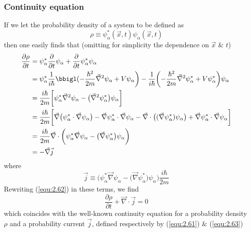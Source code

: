 \subsubsection{Continuity equation}
If we let the probability density of a system to be defined
as
\begin{equation}
  \rho \equiv \psi^*_{\alpha}(\vec{x},t)
  \psi_{\alpha}(\vec{x},t)
  \label{equ:2.61}
\end{equation}
then one easily finds that (omitting for simplicity the
dependence on $\vec{x}$ \& $t$)
\begin{align}
  \frac{\partial \rho}{\partial t} &= \psi_{\alpha}^*
  \frac{\partial}{\partial t} \psi_{\alpha} +
  \frac{\partial}{\partial t} \psi_{\alpha}^* \psi_{\alpha}
  \nonumber \\
  &=
  \psi_{\alpha}^* \frac{1}{i\hbar}
  \bbigl(-\frac{\hbar^2}{2m}\vec{\nabla}^2 \psi_{\alpha} +
  V\psi_{\alpha}\biggr) - 
  \frac{1}{i\hbar} \biggl(-\frac{\hbar^2}{2m}\vec{\nabla}^2
  \psi_{\alpha}^* + V\psi_{\alpha}^* \biggr) \psi_{\alpha}
  \nonumber \\
  &=
  \frac{i\hbar}{2m} \biggl[\psi_{\alpha}^* \vec{\nabla}^2
  \psi_{\alpha}-\bigl(\vec{\nabla}^2
\psi_{\alpha}^*\bigr)\psi_{\alpha}\biggr] \nonumber \\
&=
\frac{i\hbar}{2m}
\biggl[
  \vec{\nabla}\bigl(\psi_{\alpha}^*\cdot
  \vec{\nabla}\psi_{\alpha}\bigr)-
  \vec{\nabla}\psi_{\alpha}^* \cdot
  \vec{\nabla}\psi_{\alpha} -
  \vec{\nabla}\cdot\bigl((\vec{\nabla}\psi_{\alpha}^*)\psi_{\alpha}\bigr)
  +
  \vec{\nabla}\psi_{\alpha}^* \cdot \vec{\nabla}\psi_{\alpha}
\biggr]\nonumber \\
&=
\frac{i\hbar}{2m} \vec{\nabla}\cdot \biggl(\psi_{\alpha}^* 
\vec{\nabla}\psi_{\alpha} -
\bigl(\vec{\nabla}\psi_{\alpha}^*\bigr)\psi_{\alpha}
\biggr) \nonumber\\
&=
- \vec{\nabla} \vec{j} \label{equ:2.62}
\end{align}
where
\begin{equation}
  \vec{j}\equiv
\biggl(\psi_{\alpha}^* 
\vec{\nabla}\psi_{\alpha} -
\bigl(\vec{\nabla}\psi_{\alpha}^*\bigr)\psi_{\alpha}
\biggr) \frac{i\hbar}{2m}
  \label{equ:2.63}
\end{equation}
Rewriting (\ref{equ:2.62}) in these terms, we find
\begin{equation}
  \frac{\partial \rho}{\partial t} + \vec{\nabla}\cdot
  \vec{j} = 0
  \label{equ:2.64}
\end{equation}
which coincides with the well-known continuity equation for
a probability density $\rho$ and a probability current
$\vec{j}$, defined respectively by (\ref{equ:2.61}) \&
(\ref{equ:2.63})
